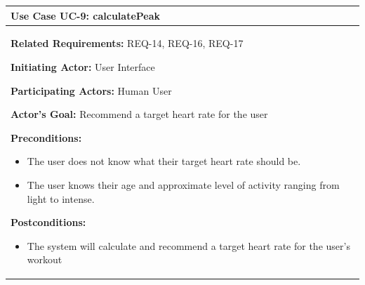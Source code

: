 \documentclass[letterpaper,english, 12pt]{scrreprt}
\begin{document}
\begin{center}
        \begin{longtable}{|C{15cm}|}
                \hline
                        \textbf{Use Case UC-9: calculatePeak}\\

                \hline
                        \begin{flushleft}
                                \textbf{Related Requirements: } REQ-14, REQ-16, REQ-17
                        \end{flushleft}
                        \begin{flushleft}
                                \textbf{Initiating Actor: } User Interface
                        \end{flushleft}
                        \begin{flushleft}
                                \textbf{Participating Actors: } Human User
                        \end{flushleft}
                        \begin{flushleft}
                                \textbf{Actor's Goal: } Recommend a target heart rate for the user
                        \end{flushleft}
                        \begin{flushleft}
                                \textbf{Preconditions: }
                        \end{flushleft}
                                \begin{itemize}
                                        \item The user does not know what their target heart rate should be.
                                        \item The user knows their age and approximate level of activity ranging from light to intense.
                                \end{itemize}
                        \begin{flushleft}
                                \textbf{Postconditions: }
                        \end{flushleft}
                                \begin{itemize}
                                        \item The system will calculate and recommend a target heart rate for the user's workout
                                \end{itemize}
                        \begin{flushleft}

\end{flushleft}
\end{longtable}
\end{center}
\end{document}
